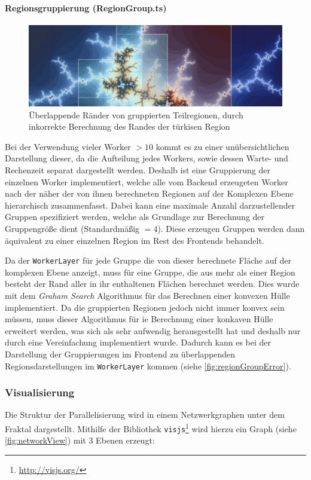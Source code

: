 \paragraph{Regionsgruppierung (RegionGroup.ts)}\label{par:regionGroup}
\begin{figure}
	\centering
	\includegraphics[width=\linewidth]{img/Implementierung/region_group_error}
	\caption{Überlappende Ränder von gruppierten Teilregionen, durch inkorrekte Berechnung des Randes der türkisen Region
	}\label{fig:regionGroupError}
\end{figure}
Bei der Verwendung vieler Worker \( > 10 \) kommt es zu einer unübersichtlichen Darstellung
dieser, da die Aufteilung jedes Workers, sowie dessen Warte- und Rechenzeit separat dargestellt werden.
Deshalb ist eine Gruppierung der einzelnen Worker implementiert, welche alle vom Backend erzeugeten Worker
nach der näher der von ihnen berechneten Regionen auf der Komplexen Ebene hierarchisch zusammenfasst. Dabei kann eine maximale
Anzahl darzustellender Gruppen spezifiziert werden, welche als Grundlage zur Berechnung der Gruppengröße dient (Standardmäßig \( = 4 \)).
Diese erzeugen Gruppen werden dann äquivalent zu einer einzelnen Region im Rest des Frontends behandelt.

Da der \verb|WorkerLayer| für jede Gruppe die von dieser berechnete Fläche auf der komplexen Ebene anzeigt,
muss für eine Gruppe, die aus mehr als einer Region besteht der Rand aller in ihr enthaltenen Flächen berechnet werden.
Dies wurde mit dem \textit{Graham Search}\cite{Cormen} Algorithmus für das Berechnen einer konvexen Hülle implementiert.
Da die gruppierten Regionen jedoch nicht immer konvex sein müssen, muss dieser Algorithmus für ie Berechnung einer konkaven Hülle erweitert
werden, was sich als sehr aufwendig herausgestellt hat und deshalb nur durch eine Vereinfachung implementiert wurde.
Dadurch kann es bei der Darstellung der Gruppierungen im Frontend zu überlappenden Regionsdarstellungen im \verb|WorkerLayer| kommen (siehe \autoref{fig:regionGroupError}).

\subsubsection{Visualisierung}
Die Struktur der Parallelisierung wird in einem Netzwerkgraphen unter dem Fraktal dargestellt.
Mithilfe der Bibliothek \verb|visjs|\footnote{\url{http://visjs.org/}} wird hierzu ein
Graph (siehe \autoref{fig:networkView}) mit 3 Ebenen erzeugt:

